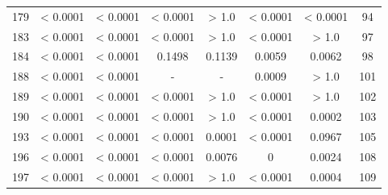 {\begin{longtable}{cccccccc}
179 & {\color{red} < 0.0001} & {\color{red} < 0.0001} & {\color{red} < 0.0001} & > 1.0 & {\color{red} < 0.0001} & {\color{red} < 0.0001} & 94 \\
183 & {\color{red} < 0.0001} & {\color{red} < 0.0001} & {\color{red} < 0.0001} & > 1.0 & {\color{red} < 0.0001} & > 1.0 & 97 \\
184 & {\color{red} < 0.0001} & {\color{red} < 0.0001} & 0.1498 & 0.1139 & {\color{red}0.0059} & {\color{red}0.0062} & 98 \\
188 & {\color{red} < 0.0001} & {\color{red} < 0.0001} & - & - &  {\color{red}0.0009} & > 1.0 & 101 \\
189 & {\color{red} < 0.0001} & {\color{red} < 0.0001} & {\color{red} < 0.0001} & > 1.0 & {\color{red} < 0.0001} & > 1.0 & 102 \\
190 & {\color{red} < 0.0001} & {\color{red} < 0.0001} & {\color{red} < 0.0001} & > 1.0 & {\color{red} < 0.0001} & {\color{red}0.0002} & 103 \\
193 & {\color{red} < 0.0001} & {\color{red} < 0.0001} & {\color{red} < 0.0001} & {\color{red}0.0001} & {\color{red} < 0.0001} & 0.0967 & 105 \\
196 & {\color{red} < 0.0001} & {\color{red} < 0.0001} & {\color{red} < 0.0001} & {\color{red}0.0076} & {\color{red}0} & {\color{red}0.0024} & 108 \\
197 & {\color{red} < 0.0001} & {\color{red} < 0.0001} & {\color{red} < 0.0001} & > 1.0 & {\color{red} < 0.0001} & {\color{red}0.0004} & 109 \\ \hline
\end{longtable}
}

